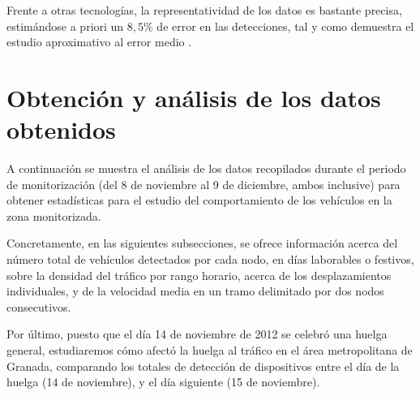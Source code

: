 \documentclass[twocolumn,twoside]{Jornadas}
\begin{document}



Frente a otras tecnologías, la representatividad de los datos es bastante precisa, estimándose a priori un $8,5\%$ de error en las detecciones, tal y como demuestra el estudio aproximativo al error medio \cite{estudioprecision}.


\section{Obtención y análisis de los datos obtenidos}
\label{analisis}

A continuación se muestra el análisis de los datos recopilados durante el periodo de monitorización (del 8 de noviembre al 9 de diciembre, ambos inclusive) para obtener estadísticas 
para el estudio del comportamiento de los vehículos en la zona monitorizada.

Concretamente, en las siguientes subsecciones, se ofrece información acerca del número total de vehículos detectados por cada nodo, en días laborables o festivos, sobre la densidad del tráfico por rango horario, acerca de los desplazamientos individuales, y de la velocidad media en un tramo delimitado por dos nodos consecutivos.

Por último, puesto que el día 14 de noviembre de 2012 se celebró una huelga general, estudiaremos cómo afectó la huelga al tráfico en el área metropolitana de Granada, comparando los totales de detección de dispositivos entre el día de la huelga (14 de noviembre), y el día siguiente (15 de noviembre).
\end{document}
